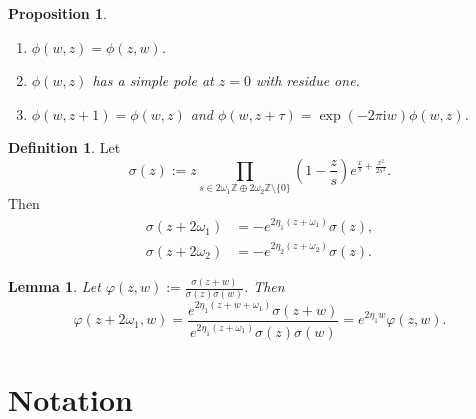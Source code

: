 \documentclass[11pt]{report}
\newtheorem{lemma}[theorem]{Lemma}
\newtheorem{prop}[theorem]{Proposition}
\theoremstyle{definition}
\newtheorem{definition}[theorem]{Definition}
\theoremstyle{remark}
\theoremstyle{remark}
\newcommand{\Z}{\mathbb{Z}}
\newcommand{\I}{\mathrm{i}}
\begin{document}
\begin{prop}
\begin{enumerate}[label=(\roman*)]
\item $\phi(w,z) = \phi(z,w)$.
\item $\phi(w,z)$ has a simple pole at $z=0$ with residue one.
\item $\phi(w,z+1) = \phi(w,z)$ and $\phi(w,z+\tau) = \exp(-2\pi\I w) \phi(w,z)$.
\end{enumerate}
\end{prop}

\begin{definition}
Let
\begin{equation*}
\sigma(z) := z \prod_{s \in 2\omega_1 \Z \oplus 2\omega_2\Z \setminus \{ 0 \}} \left(1-\frac{z}{s}\right) e^{\frac{x}{s}+\frac{x^2}{2s^2}}.
\end{equation*}
Then
\begin{align*}
\sigma(z+2\omega_1) &= -e^{2\eta_1(z+\omega_1)} \sigma(z), \\
\sigma(z+2\omega_2) &= -e^{2\eta_2(z+\omega_2)} \sigma(z).
\end{align*}
\end{definition}

\begin{lemma}
Let $\varphi(z,w) := \frac{\sigma(z+w)}{\sigma(z)\sigma(w)}$. Then
\begin{equation*}
\varphi(z+2\omega_1,w) = \frac{e^{2\eta_1(z+w+\omega_1)}\sigma(z+w)}{e^{2\eta_1(z+\omega_1)}\sigma(z)\sigma(w)} = e^{2\eta_1 w} \varphi(z,w).
\end{equation*}
\end{lemma}


\chapter*{Notation}\label{chapter:notation}
\end{document}

